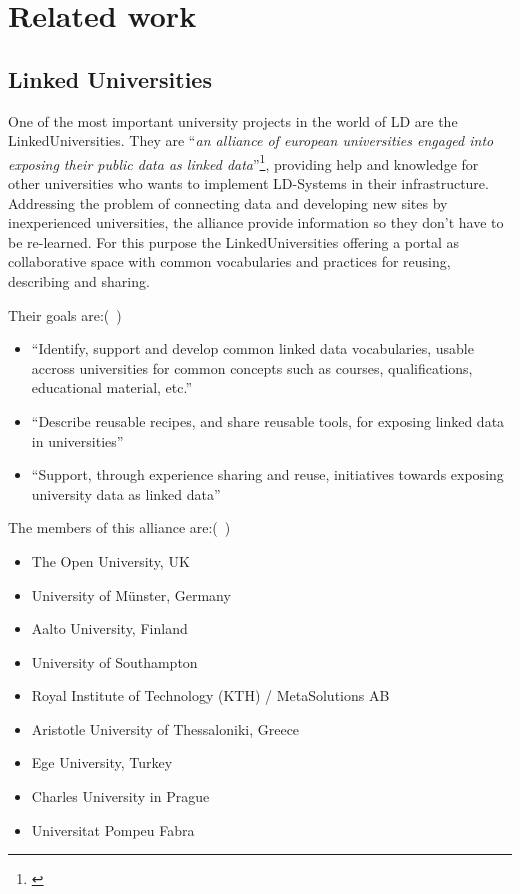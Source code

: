 \section{Related work}
\subsection{Linked Universities}\label{linkeduniversities}
One of the most important university projects in the world of LD are the LinkedUniversities. They are "`\textit{an alliance of european universities engaged into exposing their public data as linked data}"'\footnote{\citet{url:linkeduniversities}}, providing help and knowledge for other universities who wants to implement LD-Systems in their infrastructure. Addressing the problem of connecting data and developing new sites by inexperienced universities, the alliance provide information so they don't have to be re-learned. For this purpose the LinkedUniversities offering a portal as collaborative space with common vocabularies and practices for reusing, describing and sharing.

Their goals are:(~\citet{url:linkeduniversities})

\begin{itemize}
\item "`Identify, support and develop common linked data vocabularies, usable accross universities for common concepts such as courses, qualifications, educational material, etc."'
\item "`Describe reusable recipes, and share reusable tools, for exposing linked data in universities"'
\item "`Support, through experience sharing and reuse, initiatives towards exposing university data as linked data"'
\end{itemize}


The members of this alliance are:(~\citet{url:linked-universities-members})
\begin{itemize}
	\item The Open University, UK
	\item University of Münster, Germany
	\item Aalto University, Finland
	\item University of Southampton
	\item Royal Institute of Technology (KTH) / MetaSolutions AB
	\item Aristotle University of Thessaloniki, Greece
	\item Ege University, Turkey
	\item Charles University in Prague
	\item Universitat Pompeu Fabra
\end{itemize}

